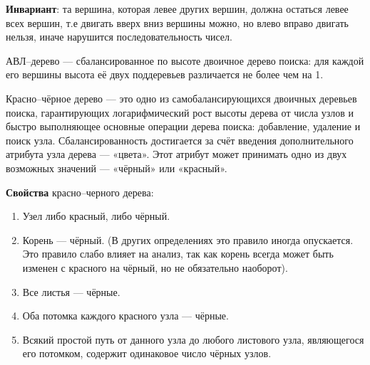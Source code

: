 \documentclass[a4paper,12pt]{article}
\theoremstyle{plain} %
\theoremstyle{definition} %
\theoremstyle{remark} %
\newcounter{num}
\begin{document}
\textbf{Инвариант}: та вершина, которая левее других вершин, должна остаться левее всех вершин, т.е двигать вверх вниз вершины можно, но влево вправо двигать нельзя, иначе нарушится последовательность чисел.

\textsf{АВЛ--дерево} --- сбалансированное по высоте двоичное дерево поиска: для каждой его вершины высота её двух поддеревьев различается не более чем на 1.


\textsf{Красно--чёрное дерево} --- это одно из самобалансирующихся двоичных деревьев поиска, гарантирующих логарифмический рост высоты дерева от числа узлов и быстро выполняющее основные операции дерева поиска: добавление, удаление и поиск узла. Сбалансированность достигается за счёт введения дополнительного атрибута узла дерева --- «цвета». Этот атрибут может принимать одно из двух возможных значений --- «чёрный» или «красный».

\textbf{Свойства} красно--черного дерева:
\begin{enumerate}
	\item Узел либо красный, либо чёрный.
	\item Корень --- чёрный. (В других определениях это правило иногда опускается. Это правило слабо влияет на анализ, так как корень всегда может быть изменен с красного на чёрный, но не обязательно наоборот).
	\item Все листья --- чёрные.
	\item Оба потомка каждого красного узла --- чёрные.
	\item Всякий простой путь от данного узла до любого листового узла, являющегося его потомком, содержит одинаковое число чёрных узлов.
\end{enumerate}








\begin{comment}
\begin{center}
	\vfill \emph{{\small Г. С. Демьянов, \href{https://vk.com/id37346992}{VK}\\
С. С. Клявинек, \href{https://vk.com/id85132547}{VK}
}}
\end{center}
\end{comment}
\end{document}
